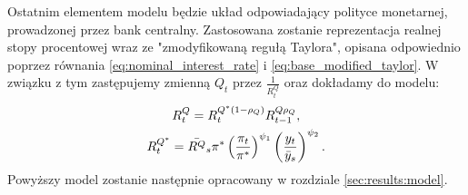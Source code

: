 Ostatnim elementem modelu będzie układ odpowiadający polityce monetarnej, prowadzonej przez bank centralny. Zastosowana zostanie reprezentacja realnej stopy procentowej wraz ze "zmodyfikowaną regułą Taylora", opisana odpowiednio poprzez równania \eqref{eq:nominal_interest_rate} i \eqref{eq:base_modified_taylor}. W związku z tym zastępujemy zmienną $Q_t$ przez $\frac{1}{R^Q_t}$ oraz dokładamy do modelu:
\begin{gather}
    R^Q_t = R_t^{Q^*(1-\rho_Q)}R_{t-1}^{Q\rho_Q}, \\
    R^{Q^*}_t = \bar{R^Q}_s \pi^* \left( \frac{\pi_t}{\pi^*}\right)^{\psi_1} \left(\frac{y_t}{\bar{y}_s}\right)^{\psi_2}.
\end{gather}
Powyższy model zostanie następnie opracowany w rozdziale \ref{sec:results:model}.
 